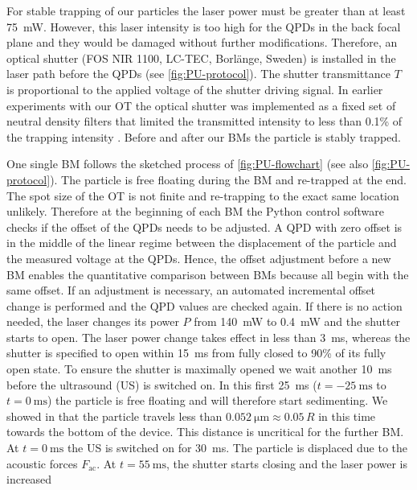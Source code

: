 For stable trapping of our particles the laser power must be greater than at 
least \SI{75}{\milli\watt}. However, this laser intensity is too high for the 
QPDs in the back focal plane and they would be damaged without further 
modifications. Therefore, an optical shutter (FOS NIR 1100, LC-TEC, Borlänge, 
Sweden) is installed in the laser path before the QPDs (see 
\cref{fig:PU-protocol}). The shutter transmittance $T$ is proportional to the 
applied voltage of the shutter driving signal. In earlier experiments with our 
OT the optical shutter was implemented as a fixed set of neutral density 
filters that limited the transmitted intensity to less than 0.1\% of the 
trapping intensity \cite{Lakaemper2015,Lamprecht2016,Lamprecht2021}. Before and 
after our BMs the particle is stably trapped.

One single BM follows the sketched process of \cref{fig:PU-flowchart} (see also 
\cref{fig:PU-protocol}). The particle is free floating during the BM and 
re-trapped at the end. The spot size of the OT is not finite and re-trapping to 
the exact same location unlikely. Therefore at the beginning of each BM the 
Python control software checks if the offset of the QPDs needs to be adjusted. 
A QPD with zero offset is in the middle of the linear regime between the 
displacement of the particle and the measured voltage at the QPDs. Hence, the 
offset adjustment before a new BM enables the quantitative comparison between 
BMs because all begin with the same offset. If an adjustment is necessary, an 
automated incremental offset change is performed and the QPD values are checked 
again. If there is no action needed, the laser changes its power $P$ from 
\SI{140}{\milli\watt} to \SI{0.4}{\milli\watt} and the shutter starts to open. 
The laser power change takes effect in less than \SI{3}{\ms}, whereas the 
shutter is specified to open within \SI{15}{\ms} from fully closed to 90\% of 
its fully open state. To ensure the shutter is maximally opened we wait another 
\SI{10}{\ms} before the ultrasound (US) is switched on. In this first 
\SI{25}{\ms} ($t=\SI{-25}{\ms}$ to $t=\SI{0}{\ms}$) the particle is free 
floating and will therefore start sedimenting. We showed in \cite{Goering2021} 
that the particle travels less than $\SI{0.052}{\um}\approx 0.05\,R$ in this 
time towards the bottom of the device. This distance is uncritical for the 
further BM. At $t=\SI{0}{\ms}$ the US is switched on for \SI{30}{\ms}. The 
particle is displaced due to the acoustic forces $F_{\mathrm{ac}}$. At 
$t=\SI{55}{\ms}$, the shutter starts closing and the laser power is increased 
